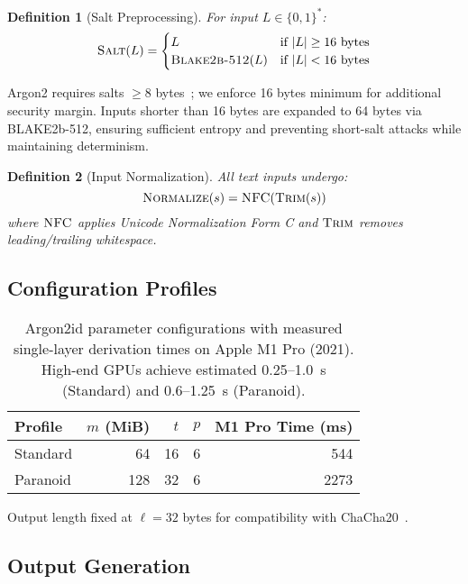 \documentclass[11pt]{article}
\newtheorem{definition}{Definition}
\begin{document}
\begin{definition}[Salt Preprocessing]
For input $L \in \{0,1\}^*$:
\begin{equation}
\textsc{Salt}(L) =
\begin{cases}
L & \text{if } |L| \geq 16 \text{ bytes} \\
\textsc{Blake2b-512}(L) & \text{if } |L| < 16 \text{ bytes}
\end{cases}
\end{equation}
\end{definition}

Argon2 requires salts $\geq 8$ bytes~\cite{rfc9106}; we enforce 16 bytes minimum for additional security margin. Inputs shorter than 16 bytes are expanded to 64 bytes via BLAKE2b-512, ensuring sufficient entropy and preventing short-salt attacks while maintaining determinism.

\begin{definition}[Input Normalization]
All text inputs undergo:
\begin{equation}
\textsc{Normalize}(s) = \textsc{NFC}(\textsc{Trim}(s))
\end{equation}
where $\textsc{NFC}$ applies Unicode Normalization Form C and $\textsc{Trim}$ removes leading/trailing whitespace.
\end{definition}

\subsection{Configuration Profiles}

\begin{table}[H]
\centering
\begin{tabular}{@{}lrrrr@{}}
\toprule
\textbf{Profile} & $m$ (MiB) & $t$ & $p$ & \textbf{M1 Pro Time (ms)} \\
\midrule
Standard & 64 & 16 & 6 & 544 \\
Paranoid & 128 & 32 & 6 & 2273 \\
\bottomrule
\end{tabular}
\caption{Argon2id parameter configurations with measured single-layer derivation times on Apple M1 Pro (2021). High-end GPUs achieve estimated 0.25--1.0~s (Standard) and 0.6--1.25~s (Paranoid).}
\label{tab:profiles}
\end{table}

Output length fixed at $\ell = 32$ bytes for compatibility with ChaCha20~\cite{rfc8439}.

\subsection{Output Generation}
\end{document}

